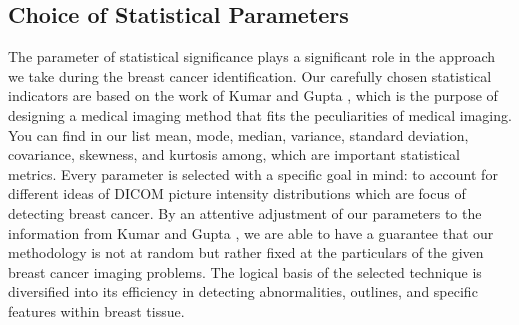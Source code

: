 \subsection{Choice of Statistical Parameters}
The parameter of statistical significance plays a significant role in the approach we take during the breast cancer identification. Our carefully chosen statistical indicators are based on the work of Kumar and Gupta \cite{importancestats}, which is the purpose of designing a medical imaging method that fits the peculiarities of medical imaging.
You can find in our list mean, mode, median, variance, standard deviation, covariance, skewness, and kurtosis among, which are important statistical metrics. Every parameter is selected with a specific goal in mind: to account for different ideas of DICOM picture intensity distributions which are focus of detecting breast cancer.
By an attentive adjustment of our parameters to the information from Kumar and Gupta \cite{importancestats}, we are able to have a guarantee that our methodology is not at random but rather fixed at the particulars of the given breast cancer imaging problems. The logical basis of the selected technique is diversified into its efficiency in detecting abnormalities, outlines, and specific features within breast tissue.
